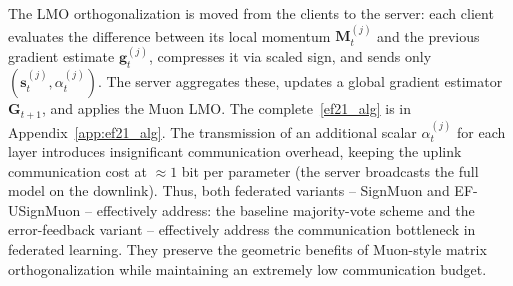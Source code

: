 \documentclass{article}
\begin{document}
The LMO orthogonalization is moved from the clients to the server: each client evaluates the difference between its local momentum $\mathbf{M}_t^{(j)}$ and the previous gradient estimate $\mathbf{g}_t^{(j)}$, compresses it via scaled sign, and sends only $(\mathbf{s}_t^{(j)}, \alpha_t^{(j)})$. The server aggregates these, updates a global gradient estimator $\mathbf{G}_{t+1}$, and applies the Muon LMO. The complete~\cref{ef21_alg} is in Appendix~\ref{app:ef21_alg}. The transmission of an additional scalar $\alpha_t^{(j)}$ for each layer introduces insignificant communication overhead, keeping the uplink communication cost at $\approx 1$ bit per parameter (the server broadcasts the full model on the downlink). Thus, both federated variants -- SignMuon and EF-USignMuon -- effectively
address: the baseline majority-vote scheme and the error-feedback variant -- effectively address the communication bottleneck in federated learning. They preserve the geometric benefits of Muon-style matrix orthogonalization while maintaining an extremely low communication budget.
\end{document}
